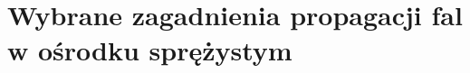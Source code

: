 \chapter{Wybrane zagadnienia propagacji fal w ośrodku sprężystym}
\label{cha:wybrane_zagadnienia_propagacji_fal_w_osrodku_sprezystym}































